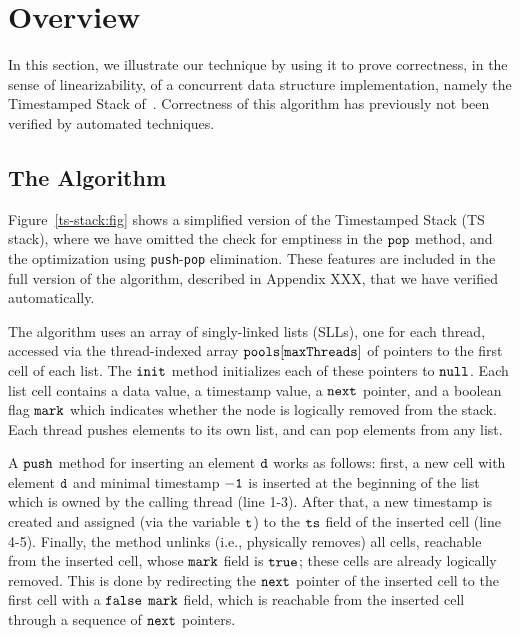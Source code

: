 \section{Overview}
\label{sec:overview}

In this section, we illustrate our technique by using it to prove correctness, in
the sense of linearizability, of
a concurrent data structure implementation, namely the Timestamped Stack
of~\cite{ts-stack}. Correctness of this algorithm has previously not been
verified by automated techniques.

\subsection{The Algorithm}



Figure~\ref{ts-stack:fig} shows a simplified version of the Timestamped Stack (TS stack), where we have omitted the check for emptiness in the ${\tt pop}$ method, and the optimization using {\tt push}-{\tt pop} elimination. These features are included in the full version of the algorithm, described in Appendix XXX, that we have verified automatically.

The algorithm uses an array of singly-linked lists (SLLs), one for each thread, accessed via the thread-indexed array ${\tt pools[maxThreads]}$ of pointers to the first cell of each list. The ${\tt init}$ method initializes each of these pointers to ${\tt null}$. Each list cell contains a data value, a timestamp value, a ${\tt next}$ pointer, and a boolean flag ${\tt mark}$ which indicates whether the node is logically removed from the stack. Each thread pushes elements to its own list, and can pop elements from any list.

A ${\tt push}$ method for inserting an element ${\tt d}$ works as follows: first, a new cell with element ${\tt d}$ and minimal timestamp ${\tt -1}$ is inserted at the beginning of the list which is owned by the calling thread (line 1-3). After that, a new timestamp is created and assigned (via the variable ${\tt t}$) to the ${\tt ts}$ field of the inserted cell (line 4-5).
Finally, the method unlinks (i.e., physically removes) all cells, reachable from the inserted cell, whose ${\tt mark}$ field is ${\tt true}$; these cells are already logically removed. This is done by redirecting the $\tt next$ pointer of the inserted cell to the first cell with a ${\tt false}$ $\tt mark$ field, which is
reachable from the inserted cell through a sequence of $\tt next$ pointers.


